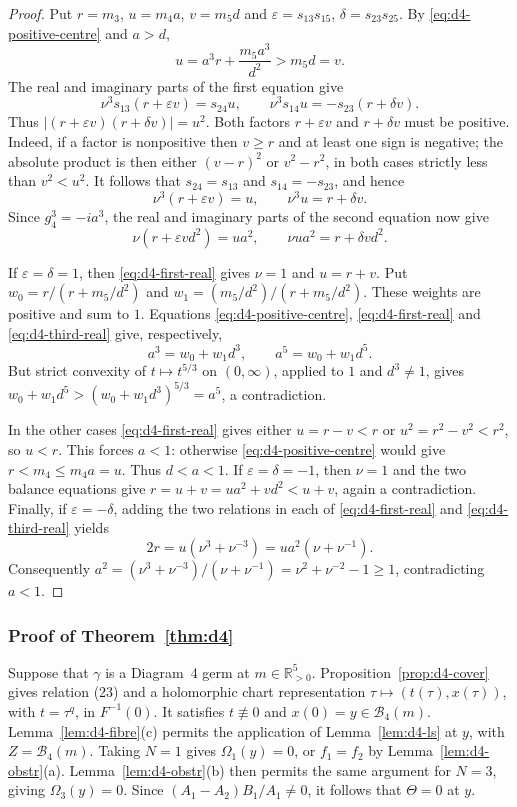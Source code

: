 \documentclass[11pt]{amsart}
\theoremstyle{definition}
\theoremstyle{remark}
\newcommand{\Rp}{\mathbb{R}_{>0}}
\begin{document}
{\begin{proof}
Put $r=m_3$, $u=m_4a$, $v=m_5d$ and
$\varepsilon=s_{13}s_{15}$, $\delta=s_{23}s_{25}$.
By \eqref{eq:d4-positive-centre} and $a>d$,
\[
 u=a^3r+\frac{m_5a^3}{d^2}>m_5d=v.
\]
The real and imaginary parts of the first equation give
\[
 \nu^3s_{13}(r+\varepsilon v)=s_{24}u,
 \qquad \nu^3s_{14}u=-s_{23}(r+\delta v).
\]
Thus $|(r+\varepsilon v)(r+\delta v)|=u^2$.
Both factors $r+\varepsilon v$ and $r+\delta v$ must be positive.
Indeed, if a factor is nonpositive then $v\ge r$ and at least one sign
is negative; the absolute product is then either $(v-r)^2$ or
$v^2-r^2$, in both cases strictly less than $v^2<u^2$.
It follows that $s_{24}=s_{13}$ and $s_{14}=-s_{23}$, and hence
\begin{equation}\label{eq:d4-first-real}
 \nu^3(r+\varepsilon v)=u,\qquad
 \nu^3u=r+\delta v.
\end{equation}
Since $g_4^3=-ia^3$, the real and imaginary parts of the second equation
now give
\begin{equation}\label{eq:d4-third-real}
 \nu(r+\varepsilon vd^2)=ua^2,\qquad
 \nu ua^2=r+\delta vd^2.
\end{equation}

If $\varepsilon=\delta=1$, then \eqref{eq:d4-first-real} gives
$\nu=1$ and $u=r+v$.  Put
$w_0=r/(r+m_5/d^2)$ and $w_1=(m_5/d^2)/(r+m_5/d^2)$.
These weights are positive and sum to $1$.
Equations \eqref{eq:d4-positive-centre}, \eqref{eq:d4-first-real} and
\eqref{eq:d4-third-real} give, respectively,
\[
 a^3=w_0+w_1d^3,\qquad a^5=w_0+w_1d^5.
\]
But strict convexity of $t\mapsto t^{5/3}$ on $(0,\infty)$, applied
to $1$ and $d^3\ne1$, gives
$w_0+w_1d^5>(w_0+w_1d^3)^{5/3}=a^5$, a contradiction.

In the other cases \eqref{eq:d4-first-real} gives either
$u=r-v<r$ or $u^2=r^2-v^2<r^2$, so $u<r$.
This forces $a<1$: otherwise \eqref{eq:d4-positive-centre} would give
$r<m_4\le m_4a=u$.  Thus $d<a<1$.
If $\varepsilon=\delta=-1$, then $\nu=1$ and the two balance equations
give $r=u+v=ua^2+vd^2<u+v$, again a contradiction.
Finally, if $\varepsilon=-\delta$, adding the two relations in each
of \eqref{eq:d4-first-real} and \eqref{eq:d4-third-real} yields
\[
 2r=u(\nu^3+\nu^{-3})=ua^2(\nu+\nu^{-1}).
\]
Consequently
$a^2=(\nu^3+\nu^{-3})/(\nu+\nu^{-1})
=\nu^2+\nu^{-2}-1\ge1$, contradicting $a<1$.
\end{proof}

}\subsubsection{Proof of Theorem~\ref{thm:d4}}
{Suppose that $\gamma$ is a Diagram~4 germ at $m\in\Rp^5$.
Proposition~\ref{prop:d4-cover} gives relation (23) and a holomorphic chart representation
$\tau\mapsto(t(\tau),x(\tau))$, with $t=\tau^q$, in $F^{-1}(0)$.
It satisfies $t\not\equiv0$ and $x(0)=y\in\mathcal B_4(m)$.
Lemma~\ref{lem:d4-fibre}(c) permits the application of Lemma~\ref{lem:d4-ls} at $y$,
with $Z=\mathcal B_4(m)$. Taking $N=1$ gives $\Omega_1(y)=0$,
or $f_1=f_2$ by Lemma~\ref{lem:d4-obstr}(a).
Lemma~\ref{lem:d4-obstr}(b) then permits the same argument for $N=3$,
giving $\Omega_3(y)=0$. Since $(A_1-A_2)B_1/A_1\ne0$, it follows that $\Theta=0$ at $y$.}
\end{document}
